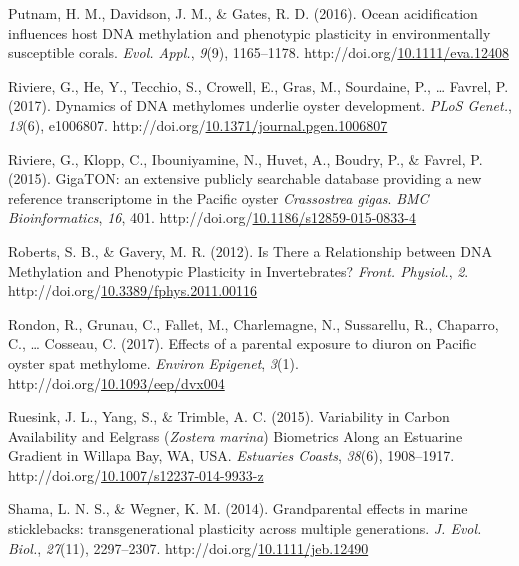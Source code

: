 \documentclass [11pt, proquest] {uwthesis}[2015/03/03]
\newlength{\cslhangindent}
\newenvironment{CSLReferences}%
{\setlength{\parindent}{0pt}%
\everypar{\setlength{\hangindent}{\cslhangindent}}\ignorespaces}%
{\par}
\begin{document}
\begin{CSLReferences}{1}{0}
\leavevmode\hypertarget{ref-Putnam2016}{}%
Putnam, H. M., Davidson, J. M., \& Gates, R. D. (2016). {Ocean acidification influences host DNA methylation and phenotypic plasticity in environmentally susceptible corals}. \emph{Evol. Appl.}, \emph{9}(9), 1165--1178. http://doi.org/\href{https://doi.org/10.1111/eva.12408}{10.1111/eva.12408}

\leavevmode\hypertarget{ref-Riviere2017}{}%
Riviere, G., He, Y., Tecchio, S., Crowell, E., Gras, M., Sourdaine, P., \ldots{} Favrel, P. (2017). {Dynamics of DNA methylomes underlie oyster development}. \emph{PLoS Genet.}, \emph{13}(6), e1006807. http://doi.org/\href{https://doi.org/10.1371/journal.pgen.1006807}{10.1371/journal.pgen.1006807}

\leavevmode\hypertarget{ref-Riviere2015}{}%
Riviere, G., Klopp, C., Ibouniyamine, N., Huvet, A., Boudry, P., \& Favrel, P. (2015). {GigaTON: an extensive publicly searchable database providing a new reference transcriptome in the Pacific oyster \emph{Crassostrea gigas}}. \emph{BMC Bioinformatics}, \emph{16}, 401. http://doi.org/\href{https://doi.org/10.1186/s12859-015-0833-4}{10.1186/s12859-015-0833-4}

\leavevmode\hypertarget{ref-Roberts2012}{}%
Roberts, S. B., \& Gavery, M. R. (2012). {Is There a Relationship between DNA Methylation and Phenotypic Plasticity in Invertebrates?} \emph{Front. Physiol.}, \emph{2}. http://doi.org/\href{https://doi.org/10.3389/fphys.2011.00116}{10.3389/fphys.2011.00116}

\leavevmode\hypertarget{ref-Rondon2017}{}%
Rondon, R., Grunau, C., Fallet, M., Charlemagne, N., Sussarellu, R., Chaparro, C., \ldots{} Cosseau, C. (2017). {Effects of a parental exposure to diuron on Pacific oyster spat methylome}. \emph{Environ Epigenet}, \emph{3}(1). http://doi.org/\href{https://doi.org/10.1093/eep/dvx004}{10.1093/eep/dvx004}

\leavevmode\hypertarget{ref-Ruesink2015}{}%
Ruesink, J. L., Yang, S., \& Trimble, A. C. (2015). {Variability in Carbon Availability and Eelgrass (\emph{Zostera marina}) Biometrics Along an Estuarine Gradient in Willapa Bay, WA, USA}. \emph{Estuaries Coasts}, \emph{38}(6), 1908--1917. http://doi.org/\href{https://doi.org/10.1007/s12237-014-9933-z}{10.1007/s12237-014-9933-z}

\leavevmode\hypertarget{ref-Shama2014}{}%
Shama, L. N. S., \& Wegner, K. M. (2014). {Grandparental effects in marine sticklebacks: transgenerational plasticity across multiple generations}. \emph{J. Evol. Biol.}, \emph{27}(11), 2297--2307. http://doi.org/\href{https://doi.org/10.1111/jeb.12490}{10.1111/jeb.12490}


\end{CSLReferences}
\end{document}

